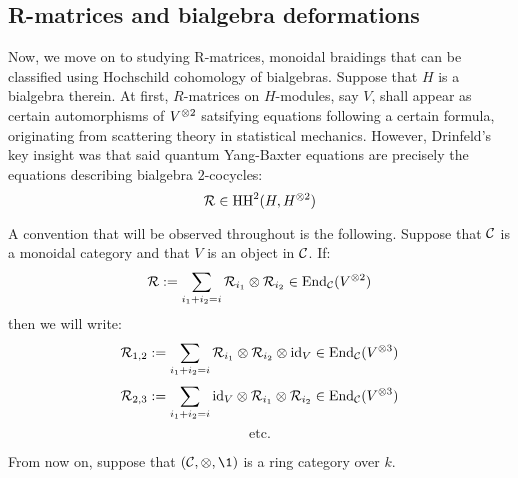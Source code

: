     \subsection{R-matrices and bialgebra deformations}
        Now, we move on to studying R-matrices, monoidal braidings that can be classified using Hochschild cohomology of bialgebras. Suppose that $H$ is a bialgebra therein. At first, $R$-matrices on $H$-modules, say $V$, shall appear as certain automorphisms of $V^{\tensor 2}$ satsifying equations following a certain  formula, originating from scattering theory in statistical mechanics. However, Drinfeld's key insight was that said quantum Yang-Baxter equations are precisely the equations describing bialgebra $2$-cocycles:
            $$\calR \in \HH^2(H, H^{\tensor 2})$$
    
        \begin{convention}
            A convention that will be observed throughout is the following. Suppose that $\mathcal{C}$ is a monoidal category and that $V$ is an object in $\mathcal{C}$. If:
                $$\calR := \sum_{i_1 + i_2 = i} \calR_{i_1} \tensor \calR_{i_2} \in \End_{\C}(V^{\tensor 2})$$
            then we will write:
                $$\calR_{1, 2} := \sum_{i_1 + i_2 = i} \calR_{i_1} \tensor \calR_{i_2} \tensor \id_V \in \End_{\C}(V^{\tensor 3})$$
                $$\calR_{2, 3} := \sum_{i_1 + i_2 = i} \id_V \tensor \calR_{i_1} \tensor \calR_{i_2} \in \End_{\C}(V^{\tensor 3})$$
                $$\text{etc.}$$
        \end{convention}

        \begin{convention}
            From now on, suppose that $(\C, \tensor, \1)$ is a ring category over $k$.
        \end{convention}
    
